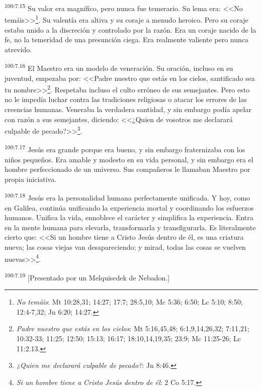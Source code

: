\documentclass[twoside, 11pt]{book}
\begin{document}
\par
\textsuperscript{100:7.15} Su valor era magnífico, pero nunca fue temerario. Su lema era: <<No temáis>>\footnote{\textit{No temáis}: Mt 10:28,31; 14:27; 17:7; 28:5,10; Mc 5:36; 6:50; Lc 5:10; 8:50; 12:4-7,32; Jn 6:20; 14:27.}. Su valentía era altiva y su coraje a menudo heroico. Pero su coraje estaba unido a la discreción y controlado por la razón. Era un coraje nacido de la fe, no la temeridad de una presunción ciega. Era realmente valiente pero nunca atrevido.

\par
\textsuperscript{100:7.16} El Maestro era un modelo de veneración. Su oración, incluso en su juventud, empezaba por: <<Padre nuestro que estás en los cielos, santificado sea tu nombre>>\footnote{\textit{Padre nuestro que estás en los cielos}: Mt 5:16,45,48; 6:1,9,14,26,32; 7:11,21; 10:32-33; 11:25; 12:50; 15:13; 16:17; 18:10,14,19,35; 23:9; Mc 11:25-26; Lc 11:2.13.}. Respetaba incluso el culto erróneo de sus semejantes. Pero esto no le impedía luchar contra las tradiciones religiosas o atacar los errores de las creencias humanas. Veneraba la verdadera santidad, y sin embargo podía apelar con razón a sus semejantes, diciendo: <<¿Quien de vosotros me declarará culpable de pecado?>>\footnote{\textit{¿Quien me declarará culpable de pecado?}: Jn 8:46.}.

\par
\textsuperscript{100:7.17} Jesús era grande porque era bueno, y sin embargo fraternizaba con los niños pequeños. Era amable y modesto en su vida personal, y sin embargo era el hombre perfeccionado de un universo. Sus compañeros le llamaban Maestro por propia iniciativa.

\par
\textsuperscript{100:7.18} Jesús era la personalidad humana perfectamente unificada. Y hoy, como en Galilea, continúa unificando la experiencia mortal y coordinando los esfuerzos humanos. Unifica la vida, ennoblece el carácter y simplifica la experiencia. Entra en la mente humana para elevarla, transformarla y transfigurarla. Es literalmente cierto que: <<Si un hombre tiene a Cristo Jesús dentro de él, es una criatura nueva; las cosas viejas van desapareciendo; y mirad, todas las cosas se vuelven nuevas>>\footnote{\textit{Si un hombre tiene a Cristo Jesús dentro de él}: 2 Co 5:17.}.

\par
\textsuperscript{100:7.19} [Presentado por un Melquisedek de Nebadon.]
\end{document}
